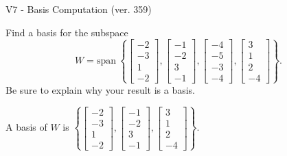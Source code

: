 \begin{exercise}
  \begin{exerciseTitle}V7 - Basis Computation (ver. 359)\end{exerciseTitle}
  \begin{exerciseStatement}
    Find a basis for the subspace 
\[W=\mathrm{span}\ \left\{\left[\begin{array}{r}
-2 \\
-3 \\
1 \\
-2
\end{array}\right] , \left[\begin{array}{r}
-1 \\
-2 \\
3 \\
-1
\end{array}\right] , \left[\begin{array}{r}
-4 \\
-5 \\
-3 \\
-4
\end{array}\right] , \left[\begin{array}{r}
3 \\
1 \\
2 \\
-4
\end{array}\right]\right\}.\]
 Be sure to explain why your result is a basis.


  \end{exerciseStatement}
  \begin{exerciseAnswer}
   A basis of \(W\) is  \(\left\{\left[\begin{array}{r}
-2 \\
-3 \\
1 \\
-2
\end{array}\right] , \left[\begin{array}{r}
-1 \\
-2 \\
3 \\
-1
\end{array}\right] , \left[\begin{array}{r}
3 \\
1 \\
2 \\
-4
\end{array}\right]\right\}\).
  


  \end{exerciseAnswer}
\end{exercise}